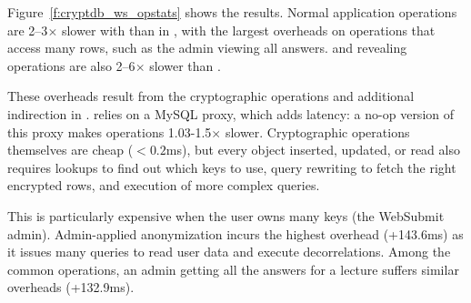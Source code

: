 %
Figure~\ref{f:cryptdb_ws_opstats} shows the results.
%
Normal application operations are 2--3$\times$ slower with \syscrypt than in
\sys, with the largest overheads on operations that access many rows, such as
the admin viewing all answers.
%
\Xxing and revealing operations are also 2--6$\times$ slower than \sys.
%

%
These overheads result from the cryptographic operations and additional
indirection in \syscrypt.
%
\syscrypt relies on a MySQL proxy, which adds latency: a no-op
version of this proxy makes operations 1.03-1.5$\times$ slower.
%
%
Cryptographic operations themselves are cheap ($<0.2$ms), but every object
inserted, updated, or read also requires lookups to find out which keys
to use, query rewriting to fetch the right encrypted rows, and
execution of more complex queries.
%

%
This is particularly expensive
when the user owns many keys (\eg the WebSubmit admin).
%
%
%
%
%
Admin-applied anonymization incurs the highest overhead (+143.6ms) as it issues
many queries to read user data and execute decorrelations.
%
Among the common operations,
an admin getting all the answers for a lecture
suffers similar overheads (+132.9ms).
%
%

